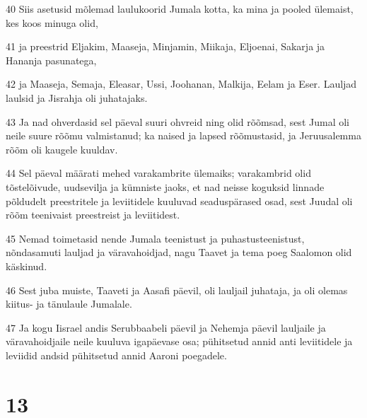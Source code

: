 \par 40 Siis asetusid mõlemad laulukoorid Jumala kotta, ka mina ja pooled ülemaist, kes koos minuga olid,
\par 41 ja preestrid Eljakim, Maaseja, Minjamin, Miikaja, Eljoenai, Sakarja ja Hananja pasunatega,
\par 42 ja Maaseja, Semaja, Eleasar, Ussi, Joohanan, Malkija, Eelam ja Eser. Lauljad laulsid ja Jisrahja oli juhatajaks.
\par 43 Ja nad ohverdasid sel päeval suuri ohvreid ning olid rõõmsad, sest Jumal oli neile suure rõõmu valmistanud; ka naised ja lapsed rõõmustasid, ja Jeruusalemma rõõm oli kaugele kuuldav.
\par 44 Sel päeval määrati mehed varakambrite ülemaiks; varakambrid olid tõstelõivude, uudsevilja ja kümniste jaoks, et nad neisse koguksid linnade põldudelt preestritele ja leviitidele kuuluvad seaduspärased osad, sest Juudal oli rõõm teenivaist preestreist ja leviitidest.
\par 45 Nemad toimetasid nende Jumala teenistust ja puhastusteenistust, nõndasamuti lauljad ja väravahoidjad, nagu Taavet ja tema poeg Saalomon olid käskinud.
\par 46 Sest juba muiste, Taaveti ja Aasafi päevil, oli lauljail juhataja, ja oli olemas kiitus- ja tänulaule Jumalale.
\par 47 Ja kogu Iisrael andis Serubbaabeli päevil ja Nehemja päevil lauljaile ja väravahoidjaile neile kuuluva igapäevase osa; pühitsetud annid anti leviitidele ja leviidid andsid pühitsetud annid Aaroni poegadele.

\chapter{13}

